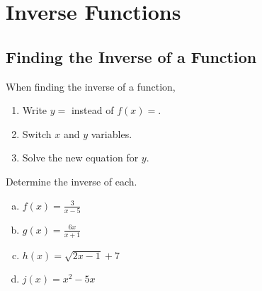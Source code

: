 \chapter{Inverse Functions}

\section{Finding the Inverse of a Function}

When finding the inverse of a function, 

\begin{enumerate}
    \item Write $y =$ instead of $f(x) = $.
    \item Switch $x$ and $y$ variables.
    \item Solve the new equation for $y$.
\end{enumerate}

\begin{example}
Determine the inverse of each.
\begin{multicols}{4}
    \begin{enumerate}[(a)]
        \item $f(x) = \tfrac{3}{x-5}$    \label{1a}
        \item $g(x) = \tfrac{6x}{x+1}$   \label{1b}
        \item $h(x) = \sqrt{2x-1}+7$
        \item $j(x) = x^2 - 5x$
    \end{enumerate}
\end{multicols}
\end{example}

